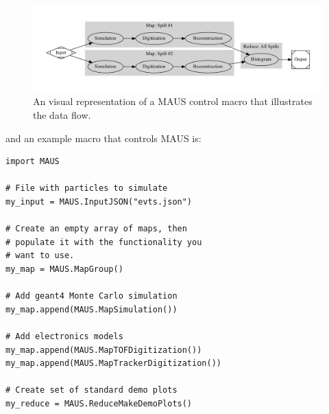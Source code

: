 \documentclass{JAC2003}
\begin{document}
\begin{figure}[tb]
    \centering
    \includegraphics*[width=168mm]{outfile}
    \caption{An visual representation of a MAUS control macro that illustrates the data flow.}
    \label{dataflow}
\end{figure}
\noindent
and an example macro that controls MAUS is:

\begin{verbatim}
import MAUS

# File with particles to simulate                                                                                                                                                     
my_input = MAUS.InputJSON("evts.json")

# Create an empty array of maps, then                                                                                                                                                     
# populate it with the functionality you                                                                                                                                                     
# want to use.                                                                                                                                                                               
my_map = MAUS.MapGroup()

# Add geant4 Monte Carlo simulation                                                                                                                                                          
my_map.append(MAUS.MapSimulation())

# Add electronics models                                                                                                                                                                     
my_map.append(MAUS.MapTOFDigitization())
my_map.append(MAUS.MapTrackerDigitization())

# Create set of standard demo plots                                                                                                                                                 
my_reduce = MAUS.ReduceMakeDemoPlots()


\end{verbatim}
\end{document}
